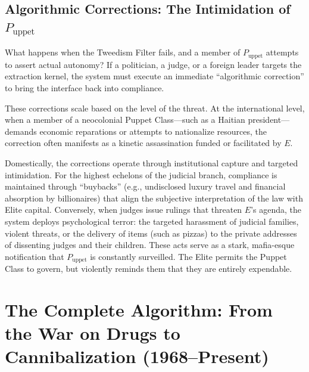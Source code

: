 \documentclass[12pt,openany]{book}
\begin{document}
\section{Algorithmic Corrections: The Intimidation of \texorpdfstring{$P_{\text{uppet}}$}{P\_uppet}}

What happens when the Tweedism Filter fails, and a member of $P_{\text{uppet}}$ attempts to assert actual autonomy? If a politician, a judge, or a foreign leader targets the extraction kernel, the system must execute an immediate ``algorithmic correction'' to bring the interface back into compliance.

These corrections scale based on the level of the threat. At the international level, when a member of a neocolonial Puppet Class---such as a Haitian president---demands economic reparations or attempts to nationalize resources, the correction often manifests as a kinetic assassination funded or facilitated by $E$.

Domestically, the corrections operate through institutional capture and targeted intimidation. For the highest echelons of the judicial branch, compliance is maintained through ``buybacks'' (e.g., undisclosed luxury travel and financial absorption by billionaires) that align the subjective interpretation of the law with Elite capital. Conversely, when judges issue rulings that threaten $E$'s agenda, the system deploys psychological terror: the targeted harassment of judicial families, violent threats, or the delivery of items (such as pizzas) to the private addresses of dissenting judges and their children. These acts serve as a stark, mafia-esque notification that $P_{\text{uppet}}$ is constantly surveilled. The Elite permits the Puppet Class to govern, but violently reminds them that they are entirely expendable.


\chapter{The Complete Algorithm: From the War on Drugs to Cannibalization (1968--Present)}
\end{document}
